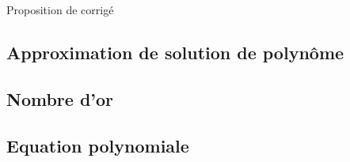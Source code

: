 
\vspace{0.1cm}
\begin{huge}
 Proposition de corrigé
\end{huge}

\subsection{Approximation de solution de polynôme}
\setcounter{thequestion}{0}
\subsection{Nombre d'or}
\setcounter{thequestion}{0}
\subsection{Equation polynomiale}
\setcounter{thequestion}{0}
